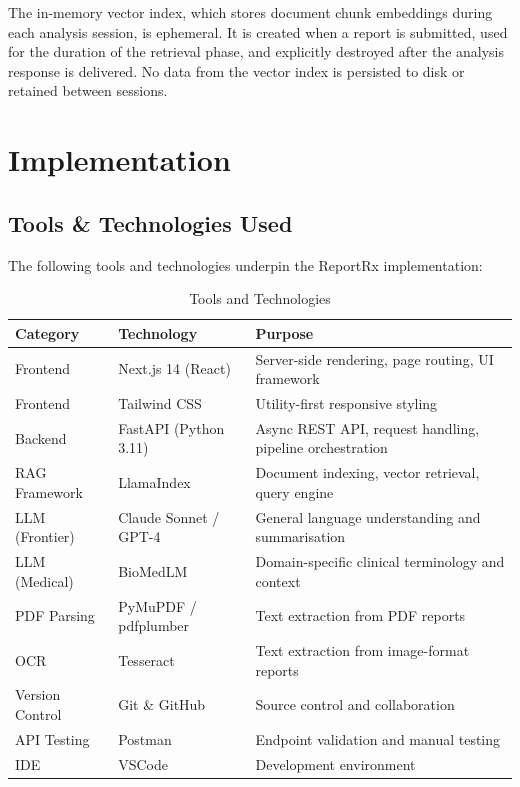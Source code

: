 \documentclass[12pt,a4paper]{report}
\begin{document}
The in-memory vector index, which stores document chunk embeddings during each analysis session, is ephemeral. It is created when a report is submitted, used for the duration of the retrieval phase, and explicitly destroyed after the analysis response is delivered. No data from the vector index is persisted to disk or retained between sessions.

\chapter{Implementation}

\section{Tools \& Technologies Used}
The following tools and technologies underpin the ReportRx implementation:

\begin{table}[h]
\centering
\caption{Tools and Technologies}
\begin{tabular}{|p{2.5cm}|p{4cm}|p{5cm}|}
    \hline
    \textbf{Category} & \textbf{Technology} & \textbf{Purpose} \\
    \hline
    Frontend & Next.js 14 (React) & Server-side rendering, page routing, UI framework \\
    Frontend & Tailwind CSS & Utility-first responsive styling \\
    Backend & FastAPI (Python 3.11) & Async REST API, request handling, pipeline orchestration \\
    RAG Framework & LlamaIndex & Document indexing, vector retrieval, query engine \\
    LLM (Frontier) & Claude Sonnet / GPT-4 & General language understanding and summarisation \\
    LLM (Medical) & BioMedLM & Domain-specific clinical terminology and context \\
    PDF Parsing & PyMuPDF / pdfplumber & Text extraction from PDF reports \\
    OCR & Tesseract & Text extraction from image-format reports \\
    Version Control & Git \& GitHub & Source control and collaboration \\
    API Testing & Postman & Endpoint validation and manual testing \\
    IDE & VSCode & Development environment \\
    \hline
\end{tabular}
\end{table}
\end{document}

